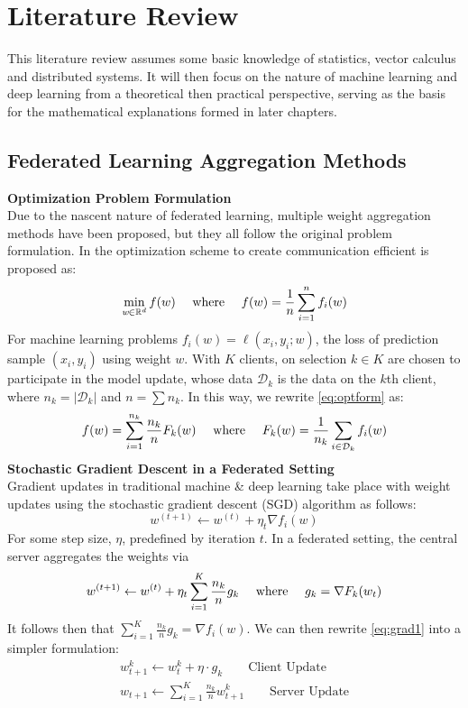 \chapter{Literature Review}
This literature review assumes some basic knowledge of statistics, vector calculus and distributed systems. It will then focus on the nature of machine learning and deep learning from a theoretical then practical perspective, serving as the basis for the  mathematical explanations formed in later chapters.
\section{Federated Learning Aggregation Methods}
\textbf{Optimization Problem Formulation}\\
Due to the nascent nature of federated learning, multiple weight aggregation methods have been proposed, but they all follow the original problem formulation. In \cite{konevcny2016federated} the optimization scheme to create communication efficient is proposed as:
\begin{equation}
    \min_{\textit{w} \in \mathbb{R}^d} f(w) \text{ \quad where \quad} f(w) = \frac{1}{n} \sum_{i=1}^{n} f_i (w) 
    \label{eq:optform}
\end{equation}
For machine learning problems $f_i (w) = \ell(x_i, y_i; w) $, the loss of prediction sample $(x_i, y_i)$ using weight $w$. With $K$ clients, on selection $k \in K$ are chosen to participate in the model update, whose data $\mathcal{D}_k$ is the data on the $k$th client, where $n_k = |\mathcal{D}_k|$ and $n = \sum n_k$. In this way, we rewrite \autoref{eq:optform} as:
\begin{equation}
    f(w) = \sum_{i = 1}^{n_k} \frac{n_k}{n} F_k (w) \text{ \quad where \quad} F_k(w) = \frac{1}{n_k} \sum_{i \in \mathcal{D}_k} f_i(w)
    \label{eq:optform2}
\end{equation}
\textbf{Stochastic Gradient Descent in a Federated Setting}\\
Gradient updates in traditional machine \& deep learning take place with weight updates using the stochastic gradient descent (SGD) algorithm as follows:
\begin{equation}
    w^{(t+1)} \leftarrow w^{(t)} + \eta_t \nabla f_i(w)
\end{equation}
For some step size, $\eta$, predefined by iteration $t$. 
In a federated setting, the central server aggregates the weights via 
\begin{equation}
    w^{(t+1)} \leftarrow w^{(t)} + \eta_t \sum_{i = 1}^{K} \frac{n_k}{n} g_k  \text{ \quad where \quad} g_k = \nabla F_k(w_t)
    \label{eq:grad1}
\end{equation}
It follows then that $\sum_{i = 1}^{K} \frac{n_k}{n} g_k = \nabla f_i(w) $. We can then rewrite \autoref{eq:grad1} into a simpler formulation:
\begin{align}
    w^k_{t+1} \leftarrow  w^k_{t} + \eta \cdot g_k \qquad \text{Client Update} \label{eq:client_fsgd}\\
    w_{t+1} \leftarrow \sum_{i = 1}^{K} \frac{n_k}{n}w^k_{t+1} \label{eq:server_fsgd} \qquad \text{Server Update}
\end{align}

